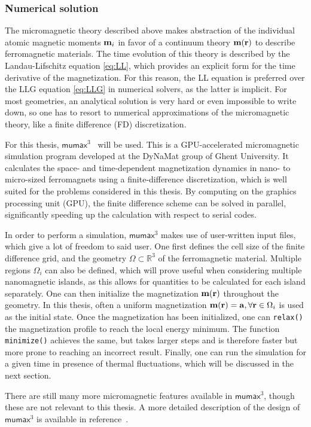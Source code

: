\documentclass[11pt,a4paper,english]{article}
\newcommand{\code}[1]{\texttt{#1}}
\newcommand{\mumax}{$\mathsf{mumax}^3$}
\begin{document}
\subsubsection{Numerical solution}
The micromagnetic theory described above makes abstraction of the individual atomic magnetic moments $\vb{m}_i$ in favor of a continuum theory $\vb{m}(\vb{r})$ to describe ferromagnetic materials. The time evolution of this theory is described by the Landau-Lifschitz equation \eqref{eq:LL}, which provides an explicit form for the time derivative of the magnetization. For this reason, the LL equation is preferred over the LLG equation \eqref{eq:LLG} in numerical solvers, as the latter is implicit. For most geometries, an analytical solution is very hard or even impossible to write down, so one has to resort to numerical approximations of the micromagnetic theory, like a finite difference (FD) discretization. \par
For this thesis, \mumax{}~\cite{MuMax3} will be used. This is a GPU-accelerated micromagnetic simulation program developed at the DyNaMat group of Ghent University. It calculates the space- and time-dependent magnetization dynamics in nano- to micro-sized ferromagnets using a finite-difference discretization, which is well suited for the problems considered in this thesis. By computing on the graphics processing unit (GPU), the finite difference scheme can be solved in parallel, significantly speeding up the calculation with respect to serial codes.~\cite{MicromagneticGPU} \par
In order to perform a simulation, \mumax{} makes use of user-written input files, which give a lot of freedom to said user. One first defines the cell size of the finite difference grid, and the geometry $\Omega \subset \mathbb{R}^3$ of the ferromagnetic material. Multiple regions $\Omega_i$ can also be defined, which will prove useful when considering multiple nanomagnetic islands, as this allows for quantities to be calculated for each island separately. One can then initialize the magnetization $\vb{m}(\vb{r})$ throughout the geometry. In this thesis, often a uniform magnetization $\vb{m}(\vb{r}) = \vb{a}, \forall \vb{r} \in \Omega_i$ is used as the initial state. Once the magnetization has been initialized, one can \code{relax()} the magnetization profile to reach the local energy minimum. The function \code{minimize()} achieves the same, but takes larger steps and is therefore faster but more prone to reaching an incorrect result. Finally, one can run the simulation for a given time in presence of thermal fluctuations, which will be discussed in the next section. \par
There are still many more micromagnetic features available in \mumax{}, though these are not relevant to this thesis. A more detailed description of the design of \mumax{} is available in reference~\cite{MuMax3}.
\end{document}
